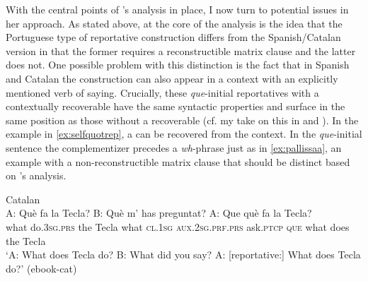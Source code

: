 With the central points of \citeauthor{Corr2016}'s analysis in place, I now turn to  potential issues in her approach. As stated above, at the core of the  analysis is the idea that the Portuguese type of reportative construction  differs from the  Spanish/Catalan version in that the former requires a reconstructible matrix clause and the latter does not. One possible problem with this distinction is the fact that  in Spanish and Catalan  the construction can also appear in a context  with an explicitly mentioned verb of saying. Crucially, these \emph{que}-initial reportatives with a  contextually recoverable \emph{}  have the same syntactic properties and  surface in the same position as those without a  recoverable \emph{} (cf. my take on this in  and ). In the example in \eqref{ex:selfquotrep},  a \emph{} can be recovered from the context. In  the \emph{que}-initial sentence the complementizer precedes a \textit{wh}-phrase just as  in \eqref{ex:pallissaa}, an example with a non-reconstructible matrix clause that should be distinct based on  \citeauthor{Corr2016}'s analysis.
  
\ea\label{ex:selfquotrep} 
Catalan\\ 
	\gll A: Què fa la Tecla? B: Què m' has preguntat? A: Que què fa la Tecla? \\
	    { } what do.\textsc{3sg.prs} the Tecla { } what \textsc{cl.1sg} \textsc{aux.2sg.prf.prs} ask.\textsc{ptcp} { } \textsc{que} what does the Tecla\\
	\glt `A: What does Tecla do? B: What did you say? A: [reportative:] What does Tecla do?' (ebook-cat)
\z


